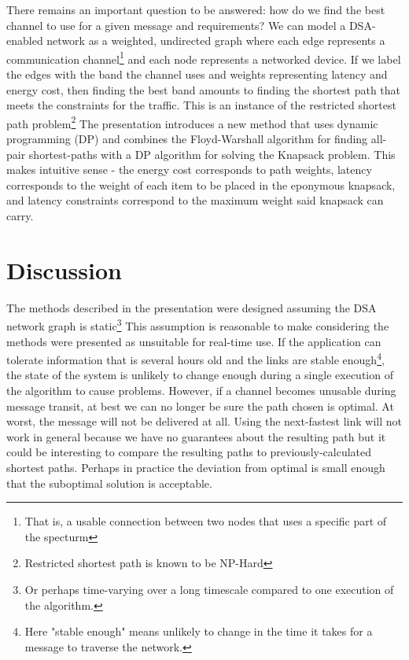 \documentclass[]{article}
\begin{document}
There remains an important question to be answered: how do we find the best channel to use for a given message and requirements? We can model a DSA-enabled network as a weighted, undirected graph where each edge represents a communication channel\footnote{That is, a usable connection between two nodes that uses a specific part of the specturm} and each node represents a networked device. If we label the edges with the band the channel uses and weights representing latency and energy cost, then finding the best band amounts to finding the shortest path that meets the constraints for the traffic. This is an instance of the restricted shortest path problem\footnote{Restricted shortest path is known to be NP-Hard} The presentation introduces a new method that uses dynamic programming (DP) and combines the Floyd-Warshall algorithm for finding all-pair shortest-paths with a DP algorithm for solving the Knapsack problem. This makes intuitive sense - the energy cost corresponds to path weights, latency corresponds to the weight of each item to be placed in the eponymous knapsack, and latency constraints correspond to the maximum weight said knapsack can carry.
\section{Discussion}
The methods described in the presentation were designed assuming the DSA network graph is static\footnote{Or perhaps time-varying over a long timescale compared to one execution of the algorithm.} This assumption is reasonable to make considering the methods were presented as unsuitable for real-time use. If the application can tolerate information that is several hours old and the links are stable enough\footnote{Here "stable enough" means unlikely to change in the time it takes for a message to traverse the network.}, the state of the system is unlikely to change enough during a single execution of the algorithm to cause problems. However, if a channel becomes unusable during message transit, at best we can no longer be sure the path chosen is optimal. At worst, the message will not be delivered at all. Using the next-fastest link will not work in general because we have no guarantees about the resulting path but it could be interesting to compare the resulting paths to previously-calculated shortest paths. Perhaps in practice the deviation from optimal is small enough that the suboptimal solution is acceptable. 
\end{document}
